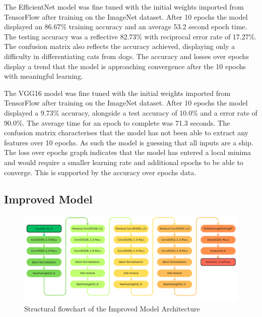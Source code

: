 \documentclass[10pt,twocolumn,letterpaper]{article}
\begin{document}
The EfficientNet model was fine tuned with the initial weights imported from TensorFlow after training on the ImageNet dataset. After 10 epochs the model displayed an 86.67\% training accuracy and an average 53.2 second epoch time. The testing accuracy was a reflective 82.73\% with reciprocal error rate of 17.27\%. The confusion matrix also reflects the accuracy achieved, displaying only a difficulty in differentiating cats from dogs. The accuracy and losses over epochs display a trend that the model is approaching convergence after the 10 epochs with meaningful learning. 

The VGG16 model was fine tuned with the initial weights imported from TensorFlow after training on the ImageNet dataset. After 10 epochs the model displayed a 9.73\% accuracy, alongside a test accuracy of 10.0\% and a error rate of 90.0\%. The average time for an epoch to complete was 71.3 seconds. The confusion matrix characterises that the model has not been able to extract any features over 10 epochs. As such the model is guessing that all inputs are a ship. The loss over epochs graph indicates that the model has entered a local minima and would require a smaller learning rate and additional epochs to be able to converge. This is supported by the accuracy over epochs data. 

\subsection{Improved Model}

\begin{figure}[ht]
    \centering
    \includegraphics[width=\textwidth, height=0.3\textheight]{improved student model diagram croppped.png}
    \caption{Structural flowchart of the Improved Model Architecture}
    \label{fig:improved model}
\end{figure}
\end{document}
